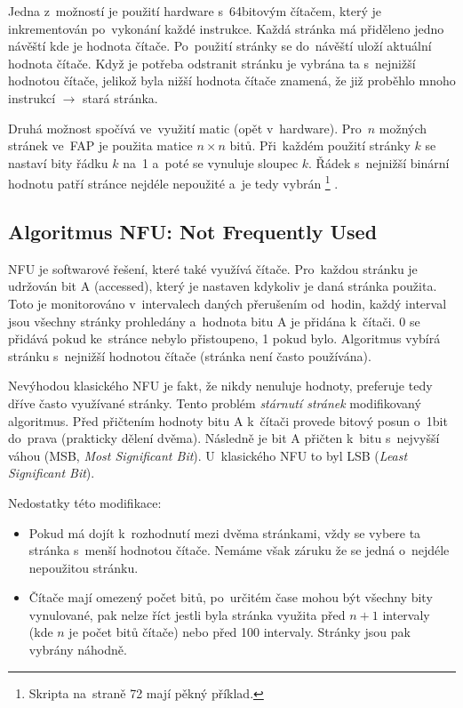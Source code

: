 Jedna z~možností je použití hardware s~64bitovým čítačem, který je inkrementován po~vykonání každé instrukce. Každá stránka má přiděleno jedno návěští kde je hodnota čítače. Po~použití stránky se do~návěští uloží aktuální hodnota čítače. Když je potřeba odstranit stránku je vybrána ta s~nejnižší hodnotou čítače, jelikož byla nižší hodnota čítače znamená, že již proběhlo mnoho instrukcí $\rightarrow$ stará stránka.

\clearpage

Druhá možnost spočívá ve~využití matic (opět v~hardware). Pro~$n$ možných stránek ve~FAP je použita matice $n \times n$ bitů. Při~každém použití stránky $k$ se nastaví bity řádku $k$ na~1 a~poté se vynuluje sloupec $k$. Řádek s~nejnižší binární hodnotu patří stránce nejdéle nepoužité a~je tedy vybrán%
\footnote{Skripta na~straně 72 mají pěkný příklad.}%
.

\subsection{Algoritmus NFU: Not Frequently Used}

NFU je softwarové řešení, které také využívá čítače. Pro~každou stránku je udržován bit A (accessed), který je nastaven kdykoliv je daná stránka použita. Toto je monitorováno v~intervalech daných přerušením od~hodin, každý interval jsou všechny stránky prohledány a~hodnota bitu A je přidána k~čítači. 0 se přidává pokud ke~stránce nebylo přistoupeno, 1 pokud bylo. Algoritmus vybírá stránku s~nejnižší hodnotou čítače (stránka není často používána).

Nevýhodou klasického NFU je fakt, že nikdy nenuluje hodnoty, preferuje tedy dříve často využívané stránky. Tento problém \emph{stárnutí stránek} modifikovaný algoritmus. Před přičtením hodnoty bitu A k~čítači provede bitový posun o~1bit do~prava (prakticky dělení dvěma). Následně je bit A přičten k~bitu s~nejvyšší váhou (MSB, \emph{Most Significant Bit}). U~klasického NFU to byl LSB (\emph{Least Significant Bit}).

Nedostatky této modifikace:

\begin{itemize}
	\item Pokud má dojít k~rozhodnutí mezi dvěma stránkami, vždy se vybere ta stránka s~menší hodnotou čítače. Nemáme však záruku že se jedná o~nejdéle nepoužitou stránku.
	\item Čítače mají omezený počet bitů, po~určitém čase mohou být všechny bity vynulované, pak nelze říct jestli byla stránka využita před $n+1$ intervaly (kde $n$ je počet bitů čítače) nebo před 100 intervaly. Stránky jsou pak vybrány náhodně.
\end{itemize}

